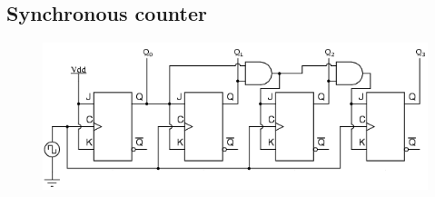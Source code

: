 \documentclass[a4paper]{article}
\begin{document}
    \subsection{Synchronous counter}
        
        \begin{figure}
            \centering
            \includegraphics[width=\textwidth]{images/synchronouscounter_schematic}
        \end{figure}


\null
\vfill


\end{document}
